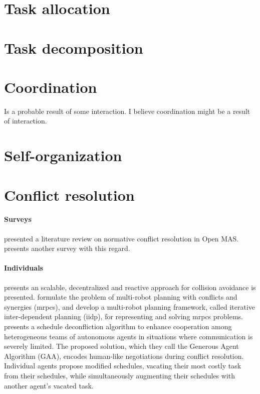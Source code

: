\documentclass{article}
\begin{document}
	
	\section{Task allocation}
	
	\section{Task decomposition}
	
	\section{Coordination}
			Is a probable result of some interaction. I believe coordination might be a result of interaction.
		
	\section{Self-organization} 
	
	\section{Conflict resolution}
		\paragraph{Surveys}\cite{santos-2018-detection-and-resolution-of-normative-conflicts-in-multi-agent-systems-a-literature-survey} presented a literature review on normative conflict resolution in Open MAS. \citet{alshabi-2007-coordination-cooperation-and-conflict-resolution-in-multi-agent-systems} presents another survey with this regard. 
		\paragraph{Individuals} \cite{ferrera-2014-multi-robot-operation-system-with-conflict-resolution} presents an scalable, decentralized and reactive approach for collision avoidance is presented. 
		\cite{jiang-2019-multi-robot-planning-with-conflicts-and-synergies} formulate the problem of multi-robot planning with conflicts and synergies (mrpcs), and develop a multi-robot planning framework, called iterative inter-dependent planning (iidp), for representing and solving mrpcs problems.
		\cite{kutzke-2019-conflict-resolution-for-heterogeneous-teams-in-communication-limited-environments-a-generous-agent-approach} presents a schedule deconfliction algorithm to enhance cooperation among heterogeneous teams of autonomous agents in situations where communication is severely limited. The proposed solution, which they call the Generous Agent Algorithm (GAA), encodes human-like negotiations during conflict resolution. Individual agents propose modified schedules, vacating their most costly task from their schedules, while  simultaneously augmenting their schedules with another agent's vacated task.  
\end{document}
